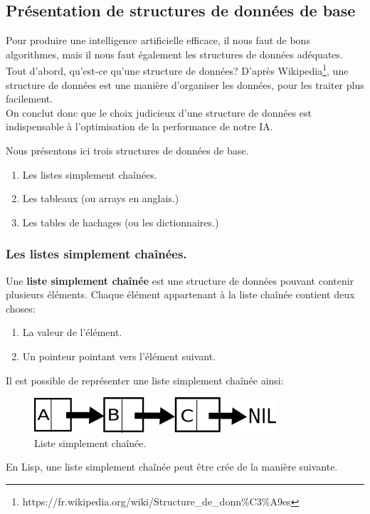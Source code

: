 \documentclass[a4paper, 12pt]{article}
\numberwithin{equation}{subsection}
\begin{document}
\subsection{Présentation de structures de données de base}
Pour produire une intelligence artificielle efficace, il nous faut de bons algorithmes, mais il nous faut également les structures de données adéquates. \\

Tout d'abord, qu'est-ce qu'une structure de données?
D'après Wikipedia\footnote{https://fr.wikipedia.org/wiki/Structure\_de\_donn\%C3\%A9es}, une structure de données est une manière d'organiser les données, pour les traiter plus facilement. \\
On conclut donc que le choix judicieux d'une structure de données est indispensable à l'optimisation de la performance de notre IA.

Nous présentons ici trois structures de données de base.
\begin{enumerate}
  \item Les listes simplement chaînées.
  \item Les tableaux (ou arrays en anglais.)
  \item Les tables de hachages (ou les dictionnaires.) \\[0.2cm]
\end{enumerate}

\subsubsection{Les listes simplement chaînées.}
Une {\bf liste simplement chaînée} est une structure de données pouvant contenir plusieurs éléments. Chaque élément appartenant à la liste chaînée contient deux choses:
\begin{enumerate}
  \item La valeur de l'élément.
  \item Un pointeur pointant vers l'élément suivant. \\[0.2cm]
\end{enumerate}

Il est possible de représenter une liste simplement chaînée ainsi: \\
\begin{figure}[H]
  \centering
  \includegraphics[width=9.0cm]{imgs/linked_list.png}
  \caption{Liste simplement chaînée.}
\end{figure}
En Lisp, une liste simplement chaînée peut être crée de la manière suivante. \\
\end{document}
